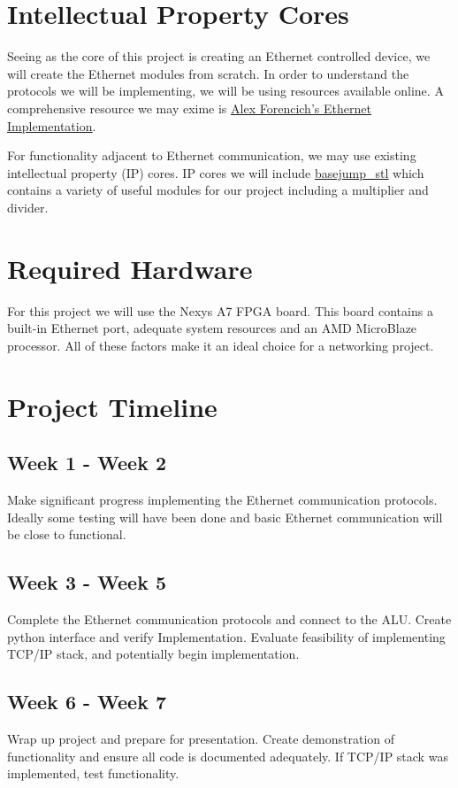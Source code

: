 \documentclass{article}
\begin{document}
\section*{Intellectual Property Cores}

Seeing as the core of this project is creating an Ethernet controlled device, we will create the Ethernet modules from scratch. In order to understand the protocols we will be implementing, we will be using resources available online. A comprehensive resource we may exime is \href{https://github.com/alexforencich/verilog-ethernet/tree/master/example/NexysVideo/fpga}{\underline{Alex Forencich's Ethernet Implementation}}.

For functionality adjacent to Ethernet communication, we may use existing intellectual property (IP) cores. IP cores we will include \href{https://github.com/bespoke-silicon-group/basejump_stl}{\underline{basejump\_stl}} which contains a variety of useful modules for our project including a multiplier and divider.

\section*{Required Hardware}

For this project we will use the Nexys A7 FPGA board. This board contains a built-in Ethernet port, adequate system resources and an AMD MicroBlaze processor. All of these factors make it an ideal choice for a networking project.

\section*{Project Timeline}

\subsection*{Week 1 - Week 2}

Make significant progress implementing the Ethernet communication protocols. Ideally some testing will have been done and basic Ethernet communication will be close to functional.

\subsection*{Week 3 - Week 5}

Complete the Ethernet communication protocols and connect to the ALU. Create python interface and verify Implementation. Evaluate feasibility of implementing TCP/IP stack, and potentially begin implementation.

\subsection*{Week 6 - Week 7}

Wrap up project and prepare for presentation. Create demonstration of functionality and ensure all code is documented adequately. If TCP/IP stack was implemented, test functionality.
\end{document}
